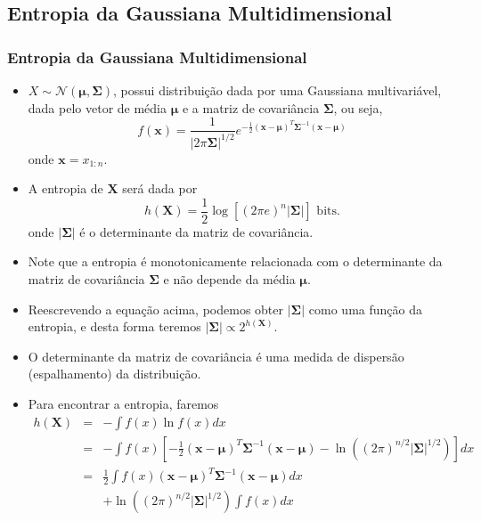 \subsection{Entropia da Gaussiana Multidimensional}
\begin{frame}[allowframebreaks]
  \frametitle{Entropia da Gaussiana Multidimensional}
  \begin{itemize}
  \item $X \sim \mathcal{N}(\mathbf{\mu}, \mathbf{\Sigma})$, possui distribuição dada por uma Gaussiana multivariável, 
	dada pelo vetor de média $\mathbf{\mu}$ e a matriz de covariância $\mathbf{\Sigma}$, ou seja,
	\begin{equation}
	f(\mathbf{x}) = \frac{1}{ \vert 2 \pi \mathbf{\Sigma} \vert^{1/2} } e^{-\frac{1}{2} (\mathbf{x} - \mathbf{\mu})^T \mathbf{\Sigma}^{-1} (\mathbf{x} - \mathbf{\mu})}
	\end{equation}
	onde $\mathbf{x} = x_{1:n}$.
  \item A entropia de $\mathbf{X}$ será dada por
	\begin{equation}
	h(\mathbf{X}) = \frac{1}{2} \log \left[ (2 \pi e)^n \vert \mathbf{\Sigma} \vert \right] \text{ bits}.
	\end{equation}
	onde $\vert \mathbf{\Sigma} \vert$ é o determinante da matriz de covariância.
  \item Note que a entropia é monotonicamente relacionada com o determinante da matriz de covariância $\mathbf{\Sigma}$ e
	não depende da média $\mathbf{\mu}$.
  \item Reescrevendo a equação acima, podemos obter $\vert \mathbf{\Sigma} \vert$ como uma função da entropia, e desta forma
	teremos $\vert \mathbf{\Sigma} \vert \propto 2^{h(\mathbf{X})}$.
  \item O determinante da matriz de covariância é uma medida de dispersão (espalhamento) da distribuição. 
  \item Para encontrar a entropia, faremos
 	\begin{eqnarray}
	h(\mathbf{X}) &=& - \int f(x) \ln f(x) dx \\
		&=& - \int f(x) \left[ -\frac{1}{2} (\mathbf{x} - \mathbf{\mu})^T \mathbf{\Sigma}^{-1} (\mathbf{x} - \mathbf{\mu}) - \ln \left( (2\pi)^{n/2} \vert \mathbf{\Sigma} \vert^{1/2} \right)  \right] dx \nonumber \\
		&=& \frac{1}{2} \int f(x) (\mathbf{x} - \mathbf{\mu})^T \mathbf{\Sigma}^{-1} (\mathbf{x} - \mathbf{\mu}) dx \nonumber \\
		&& + \ln \left( (2\pi)^{n/2} \vert \mathbf{\Sigma} \vert^{1/2} \right)  \int f(x) dx \\

\end{eqnarray}
\end{itemize}
\end{frame}
